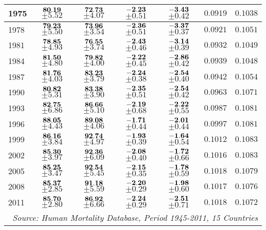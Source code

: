 \documentclass[10pt, titlepage]{article}%
\begin{document}
\begin{table}
\begin{tabular}{||l|c|c|c|c|c|c||}
  1975 &  $\bf 80.19$ $\pm 5.52$& $\bf 72.73$ $\pm 4.07$& $\bf -2.23$ $\pm 0.51$& $\bf -3.43$ $\pm 0.42$&  $0.0919$&  $0.1038$ \\ \hline\hline
  1978 &  $\bf 79.23$ $\pm 5.50$& $\bf 73.96$ $\pm 3.54$& $\bf -2.36$ $\pm 0.51$& $\bf -3.37$ $\pm 0.37$&  $0.0921$&  $0.1051$ \\ \hline\hline
  1981 &  $\bf 78.85$ $\pm 4.93$& $\bf 76.55$ $\pm 3.74$& $\bf -2.43$ $\pm 0.46$& $\bf -3.14$ $\pm 0.39$&  $0.0932$&  $0.1049$ \\ \hline\hline
  1984 &  $\bf 81.50$ $\pm 4.80$& $\bf 79.82$ $\pm 4.00$& $\bf -2.22$ $\pm 0.45$& $\bf -2.86$ $\pm 0.42$&  $0.0939$&  $0.1048$ \\ \hline\hline
  1987 &  $\bf 81.76$ $\pm 4.03$& $\bf 83.23$ $\pm 3.79$& $\bf -2.24$ $\pm 0.38$& $\bf -2.54$ $\pm 0.40$&  $0.0942$&  $0.1054$ \\ \hline\hline
  1990 &  $\bf 80.82$ $\pm 5.31$& $\bf 83.38$ $\pm 3.90$& $\bf -2.35$ $\pm 0.51$& $\bf -2.54$ $\pm 0.42$&  $0.0963$&  $0.1071$ \\ \hline\hline
  1993 &  $\bf 82.75$ $\pm 6.86$& $\bf 86.66$ $\pm 5.10$& $\bf -2.19$ $\pm 0.68$& $\bf -2.22$ $\pm 0.55$&  $0.0987$&  $0.1081$ \\ \hline\hline
  1996 &  $\bf 88.05$ $\pm 4.43$& $\bf 89.08$ $\pm 4.06$& $\bf -1.71$ $\pm 0.44$& $\bf -2.01$ $\pm 0.44$&  $0.0997$&  $0.1081$ \\ \hline\hline
  1999 &  $\bf 86.16$ $\pm 3.84$& $\bf 92.74$ $\pm 4.97$& $\bf -1.93$ $\pm 0.39$& $\bf -1.64$ $\pm 0.54$&  $0.1012$&  $0.1083$ \\ \hline\hline
  2002 &  $\bf 85.30$ $\pm 3.97$& $\bf 92.36$ $\pm 6.09$& $\bf -2.08$ $\pm 0.40$& $\bf -1.72$ $\pm 0.66$&  $0.1016$&  $0.1083$ \\ \hline\hline
  2005 &  $\bf 85.25$ $\pm 3.47$& $\bf 92.54$ $\pm 5.45$& $\bf -2.15$ $\pm 0.35$& $\bf -1.78$ $\pm 0.59$&  $0.1018$&  $0.1079$ \\ \hline\hline
  2008 &  $\bf 85.37$ $\pm 2.85$& $\bf 91.18$ $\pm 5.59$& $\bf -2.20$ $\pm 0.29$& $\bf -1.98$ $\pm 0.60$&  $0.1017$&  $0.1076$ \\ \hline\hline
  2011 &  $\bf 85.70$ $\pm 2.80$& $\bf 86.92$ $\pm 6.66$& $\bf -2.24$ $\pm 0.29$& $\bf -2.51$ $\pm 0.71$&  $0.1018$&  $0.1072$ \\ \hline\hline
        
\multicolumn{7}{||r||}{{\em Source: Human Mortality Database, Period 1945-2011, 15 Countries}} \\ \hline\hline
\end{tabular}
\label{table5a}
\end{table}
\end{document}
